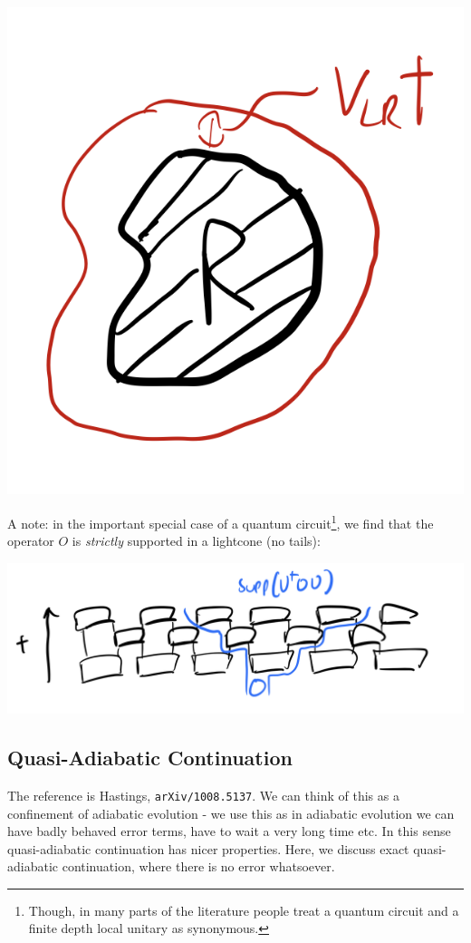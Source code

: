 \begin{enumerate}
\begin{center}
        \includegraphics[scale=0.35]{Lectures/Images/lec11-LRbound.png}
    \end{center}
    A note: in the important special case of a quantum circuit\footnote{Though, in many parts of the literature people treat a quantum circuit and a finite depth local unitary as synonymous.}, we find that the operator $O$ is \emph{strictly} supported in a lightcone (no tails):
    \begin{center}
        \includegraphics[scale=0.35]{Lectures/Images/lec12-lightcone.png}
    \end{center}
\end{enumerate}

\subsection{Quasi-Adiabatic Continuation}
The reference is Hastings, \texttt{arXiv/1008.5137}. We can think of this as a confinement of adiabatic evolution - we use this as in adiabatic evolution we can have badly behaved error terms, have to wait a very long time etc. In this sense quasi-adiabatic continuation has nicer properties. Here, we discuss exact quasi-adiabatic continuation, where there is no error whatsoever.

